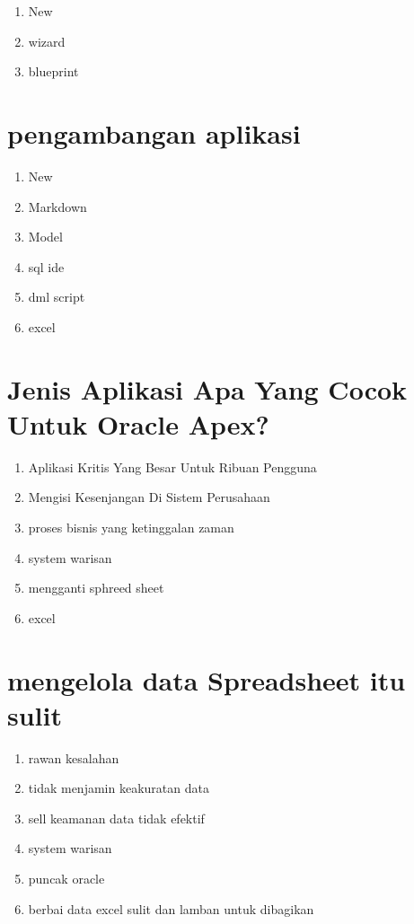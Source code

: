 \documentclass{article}
\begin{document}
\begin{enumerate}
\item New
\item wizard
\item blueprint
\end{enumerate}

\section{ pengambangan aplikasi}
\begin{enumerate}
\item New
\item Markdown
\item Model
\item sql ide
\item dml script
\item excel
\end{enumerate}

\section{Jenis Aplikasi Apa Yang Cocok Untuk Oracle
Apex?}
\begin{enumerate}
\item Aplikasi Kritis Yang Besar Untuk Ribuan Pengguna
\item Mengisi Kesenjangan Di Sistem Perusahaan
\item proses bisnis yang ketinggalan zaman
\item system warisan
\item mengganti sphreed sheet
\item excel
\end{enumerate}

\section{mengelola data  Spreadsheet itu sulit}
\begin{enumerate}
\item rawan kesalahan
\item tidak menjamin keakuratan data
\item sell keamanan data tidak efektif
\item system warisan
\item puncak oracle
\item berbai data excel sulit dan lamban untuk dibagikan
\end{enumerate}
\end{document}
